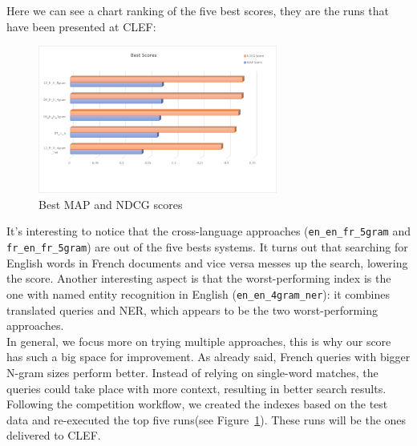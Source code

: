 Here we can see a chart ranking of the five best scores, they are the runs that have been presented at CLEF:
\begin{figure}[h!]
	\centering
	\includegraphics[width=0.7\textwidth]{figure/bestScores.png}
	\caption{Best MAP and NDCG scores}
	\label{fig:best_scores}
\end{figure}

It's interesting to notice that the cross-language approaches (\texttt{en\_en\_fr\_5gram} and \texttt{fr\_en\_fr\_5gram}) are out of the five bests systems.
It turns out that searching for English words in French documents and vice versa messes up the search, lowering the score.
Another interesting aspect is that the worst-performing index is the one with named entity recognition in English (\texttt{en\_en\_4gram\_ner}): it combines translated queries and NER, which appears to be the two worst-performing approaches.\\

In general, we focus more on trying multiple approaches, this is why our score has such a big space for improvement.
As already said, French queries with bigger N-gram sizes perform better.
Instead of relying on single-word matches, the queries could take place with more context, resulting in better search
results.\\

Following the competition workflow, we created the indexes based on the test data and re-executed the top five
runs(see Figure~\ref{fig:best_scores}).
These runs will be the ones delivered to CLEF\@.